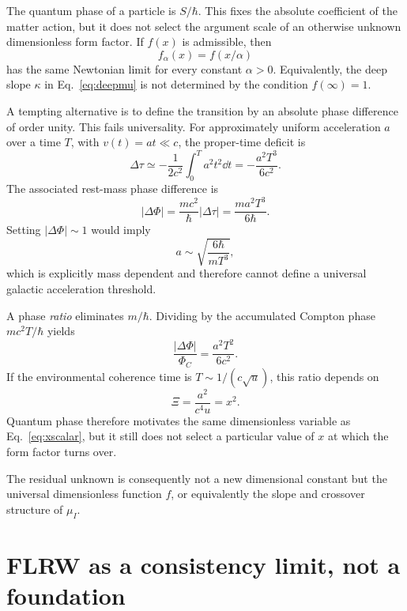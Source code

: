 \documentclass[11pt]{article}
\begin{document}
The quantum phase of a particle is $S/\hbar$. This fixes the absolute coefficient of the matter action, but it does not select the argument scale of an otherwise unknown dimensionless form factor. If $f(x)$ is admissible, then
\begin{equation}
    f_\alpha(x)=f(x/\alpha)
\end{equation}
has the same Newtonian limit for every constant $\alpha>0$. Equivalently, the deep slope $\kappa$ in Eq.~\eqref{eq:deepmu} is not determined by the condition $f(\infty)=1$.

A tempting alternative is to define the transition by an absolute phase difference of order unity. This fails universality. For approximately uniform acceleration $a$ over a time $T$, with $v(t)=at\ll c$, the proper-time deficit is
\begin{equation}
    \Delta\tau\simeq-\frac{1}{2c^2}\int_0^T a^2t^2\dd t
    =-\frac{a^2T^3}{6c^2}.
\end{equation}
The associated rest-mass phase difference is
\begin{equation}
    |\Delta\Phi|=\frac{mc^2}{\hbar}|\Delta\tau|
    =\frac{ma^2T^3}{6\hbar}.
\end{equation}
Setting $|\Delta\Phi|\sim1$ would imply
\begin{equation}
    a\sim\sqrt{\frac{6\hbar}{mT^3}},
\end{equation}
which is explicitly mass dependent and therefore cannot define a universal galactic acceleration threshold.

A phase \emph{ratio} eliminates $m/\hbar$. Dividing by the accumulated Compton phase $mc^2T/\hbar$ yields
\begin{equation}
    \frac{|\Delta\Phi|}{\Phi_C}
    =\frac{a^2T^2}{6c^2}.
\end{equation}
If the environmental coherence time is $T\sim1/(c\sqrt u)$, this ratio depends on
\begin{equation}
    \Xi=\frac{a^2}{c^4u}=x^2.
\end{equation}
Quantum phase therefore motivates the same dimensionless variable as Eq.~\eqref{eq:xscalar}, but it still does not select a particular value of $x$ at which the form factor turns over.

The residual unknown is consequently not a new dimensional constant but the universal dimensionless function $f$, or equivalently the slope and crossover structure of $\mu_I$.

\section{FLRW as a consistency limit, not a foundation}
\end{document}
